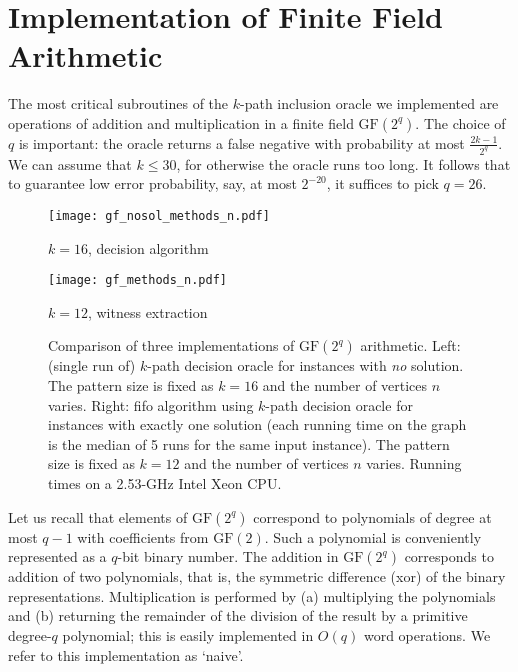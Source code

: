 \documentclass[11pt]{article}
\newcommand{\field}[1]{{\textrm{GF}}({#1})}
\begin{document}
\section{Implementation of Finite Field Arithmetic}
\label{sec:gf-impl}

The most critical subroutines of the $k$-path inclusion oracle we implemented are operations of addition and multiplication in a finite field $\field{2^q}$. The choice of $q$ is important: the oracle returns a false negative with probability at most $\frac{2k-1}{2^q}$.
We can assume that $k\le 30$, for otherwise the oracle runs too long. It follows that to guarantee low error probability, say, at most $2^{-20}$, 
it suffices to pick $q=26$. 

\begin{figure}[t]
\begin{minipage}[b]{0.5\linewidth}
\centering
\texttt{[image: gf\_nosol\_methods\_n.pdf]}

{\small $k=16$, decision algorithm}
\end{minipage}
\begin{minipage}[b]{0.5\linewidth}
\centering
\texttt{[image: gf\_methods\_n.pdf]}

{\small $k=12$, witness extraction}
\end{minipage}
\caption{\label{fig:gf-impl}Comparison of three implementations of $\field{2^q}$ arithmetic.
Left: (single run of) $k$-path decision oracle for instances with {\em no} solution. The pattern size is fixed as $k=16$ and the number of vertices $n$ varies.
Right: fifo algorithm using $k$-path decision oracle for instances with exactly one solution (each running time on the graph is the median of 5 runs for the same input instance). 
The pattern size is fixed as $k=12$ and the number of vertices $n$ varies.
Running times on a 2.53-GHz Intel Xeon CPU.
}
\end{figure}


Let us recall that elements of $\field{2^q}$ correspond to polynomials of degree at most $q-1$ with coefficients from $\field{2}$.
Such a polynomial is conveniently represented as a $q$-bit binary number.
The addition in $\field{2^q}$ corresponds to addition of two polynomials, that is, the symmetric difference (xor) of the binary representations. Multiplication is performed by (a) multiplying the polynomials and (b) returning the remainder of the division of the result by a primitive degree-$q$ polynomial; this is easily implemented in $O(q)$ word operations. We refer to this implementation as `naive'.
\end{document}
